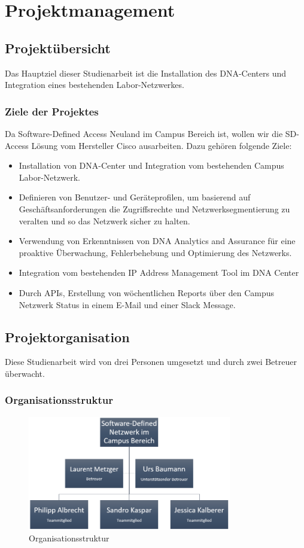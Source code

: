 \section{Projektmanagement}

\subsection{Projektübersicht}
Das Hauptziel dieser Studienarbeit ist die Installation des DNA-Centers und Integration eines bestehenden Labor-Netzwerkes.

\subsubsection{Ziele der Projektes}
Da Software-Defined Access Neuland im Campus Bereich ist, wollen wir die SD-Access Lösung vom Hersteller Cisco ausarbeiten. Dazu gehören folgende Ziele:

\begin{itemize}
	\item Installation von DNA-Center und Integration vom bestehenden Campus Labor-Netzwerk.
	\item Definieren von Benutzer- und Geräteprofilen, um basierend auf Geschäftsanforderungen die Zugriffsrechte und Netzwerksegmentierung zu veralten und so das Netzwerk sicher zu halten.
	\item Verwendung von Erkenntnissen von DNA Analytics and Assurance für eine proaktive Überwachung, Fehlerbehebung und Optimierung des Netzwerks.
	\item Integration vom bestehenden IP Address Management Tool im DNA Center
	\item Durch APIs, Erstellung von wöchentlichen Reports über den Campus Netzwerk Status in einem E-Mail und einer Slack Message. 
\end{itemize}

\subsection{Projektorganisation}
Diese Studienarbeit wird von drei Personen umgesetzt und durch zwei Betreuer überwacht.

\subsubsection{Organisationsstruktur}
\begin{figure}[H]
	\centering
	\includegraphics[height=5cm]{img/Organisationsstruktur.png}
	\caption{Organisationsstruktur}
	\label{fig:Organisationsstruktur}
\end{figure}

